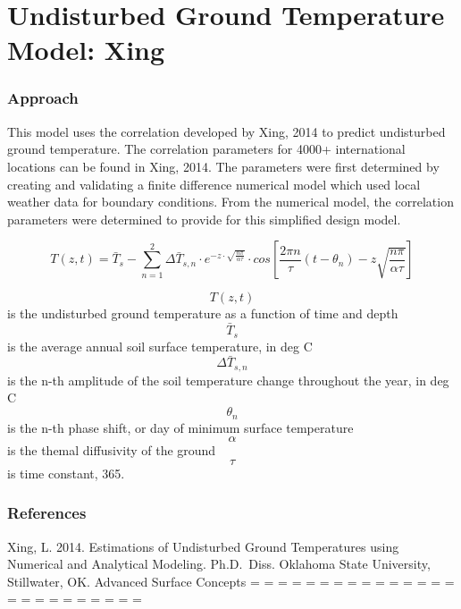 \section{Undisturbed Ground Temperature Model: Xing}\label{undisturbed-ground-temperature-model-xing}

\subsubsection{Approach}\label{approach-005}

This model uses the correlation developed by Xing, 2014 to predict undisturbed ground temperature. The correlation parameters for 4000+ international locations can be found in Xing, 2014. The parameters were first determined by creating and validating a finite difference numerical model which used local weather data for boundary conditions. From the numerical model, the correlation parameters were determined to provide for this simplified design model.

\begin{equation}
T(z,t) = \bar{T}_{s} - \sum_{n = 1}^{2} \Delta\bar{T}_{s,n} \cdot e^{-z \cdot \sqrt{\frac{n\pi}{\alpha\tau}}} \cdot cos\left[ \frac{2 \pi n}{\tau} \left(t - \theta_{n} \right) - z \sqrt{\frac{n \pi}{\alpha \tau}} \right]
\end{equation}

\[T(z,t)\] is the undisturbed ground temperature as a function of time and depth \[\bar{T}_{s}\] is the average annual soil surface temperature, in deg C \[\Delta\bar{T}_{s,n}\] is the n-th amplitude of the soil temperature change throughout the year, in deg C \[\theta_{n}\] is the n-th phase shift, or day of minimum surface temperature \[\alpha\] is the themal diffusivity of the ground \[\tau\] is time constant, 365.

\subsubsection{References}\label{references-050}

Xing, L. 2014. Estimations of Undisturbed Ground Temperatures using Numerical and Analytical Modeling. Ph.D.~Diss. Oklahoma State University, Stillwater, OK. Advanced Surface Concepts = = = = = = = = = = = = = = = = = = = = = = = = =
